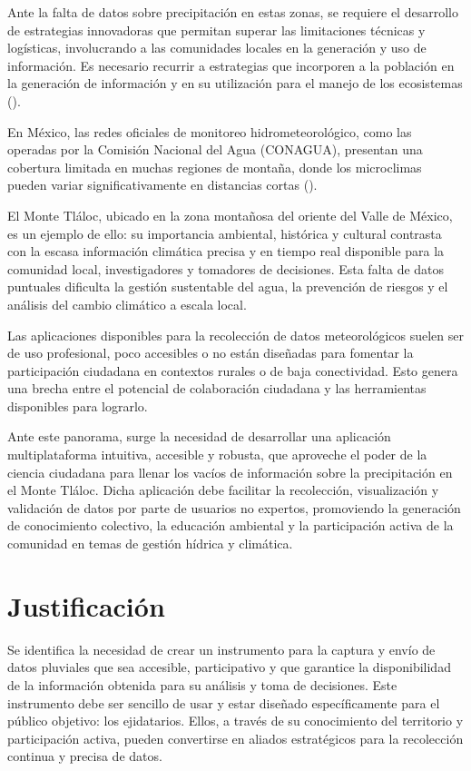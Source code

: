 Ante la falta de datos sobre precipitación en estas zonas, se requiere el desarrollo de estrategias innovadoras que permitan superar las limitaciones técnicas y logísticas, involucrando a las comunidades locales en la generación y uso de información. Es necesario recurrir a estrategias que incorporen a la población en la generación de información y en su utilización para el manejo de los ecosistemas (\cite{hubp1990}).


En México, las redes oficiales de monitoreo hidrometeorológico, como las operadas por la Comisión Nacional del Agua (CONAGUA), presentan una cobertura limitada en muchas regiones de montaña, donde los microclimas pueden variar significativamente en distancias cortas (\cite{rosas2021}).


El Monte Tláloc, ubicado en la zona montañosa del oriente del Valle de México, es un ejemplo de ello: su importancia ambiental, histórica y cultural contrasta con la escasa información climática precisa y en tiempo real disponible para la comunidad local, investigadores y tomadores de decisiones. Esta falta de datos puntuales dificulta la gestión sustentable del agua, la prevención de riesgos y el análisis del cambio climático a escala local.

Las aplicaciones disponibles para la recolección de datos meteorológicos suelen ser de uso profesional, poco accesibles o no están diseñadas para fomentar la participación ciudadana en contextos rurales o de baja conectividad. Esto genera una brecha entre el potencial de colaboración ciudadana y las herramientas disponibles para lograrlo.

Ante este panorama, surge la necesidad de desarrollar una aplicación multiplataforma intuitiva, accesible y robusta, que aproveche el poder de la ciencia ciudadana para llenar los vacíos de información sobre la precipitación en el Monte Tláloc. Dicha aplicación debe facilitar la recolección, visualización y validación de datos por parte de usuarios no expertos, promoviendo la generación de conocimiento colectivo, la educación ambiental y la participación activa de la comunidad en temas de gestión hídrica y climática.



\section{Justificación}
Se identifica la necesidad de crear un instrumento para la captura y envío de datos pluviales que sea accesible, participativo y que garantice la disponibilidad de la información obtenida para su análisis y toma de decisiones. Este instrumento debe ser sencillo de usar y estar diseñado específicamente para el público objetivo: los ejidatarios. Ellos, a través de su conocimiento del territorio y participación activa, pueden convertirse en aliados estratégicos para la recolección continua y precisa de datos.

